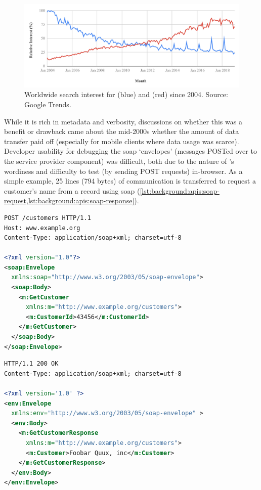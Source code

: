 \begin{figure}[h!]
  \centering
  \includegraphics[width=\linewidth]{rest-vs-soap}
  \caption[SOAP versus REST search interest over time]{Worldwide search interest for  (blue) and  (red) since 2004. Source: Google Trends.}
  \label{fig:background:apis:rest-vs-soap}
\end{figure}

While it is rich in metadata and verbosity, discussions on whether this was a benefit or drawback came about the mid-2000s \citep{zurMuehlen:2005ci,Pautasso2008} whether the amount of data transfer paid off (especially for mobile clients where data usage was scarce). Developer usability for debugging the \gls{soap} `envelopes' (messages POSTed over  to the service provider component) was difficult, both due to the nature of 's wordiness and difficulty to test (by sending POST requests) in-browser. As a simple example, 25 lines (794 bytes) of  communication is transferred to request a customer's name from a record using \gls{soap} (\cref{lst:background:apis:soap-request,lst:background:apis:soap-response}). 

\begin{samepage}
\begin{lstlisting}[language=xml,label=lst:background:apis:soap-request,caption={[An example SOAP request]A \gls{soap} \glsac{http} POST consumer request to retrieve customer record \#43456 from a web service provider. Source: \citep{Ballinger:2014aa}.}]
POST /customers HTTP/1.1
Host: www.example.org
Content-Type: application/soap+xml; charset=utf-8

<?xml version="1.0"?>
<soap:Envelope 
  xmlns:soap="http://www.w3.org/2003/05/soap-envelope">
  <soap:Body>
    <m:GetCustomer 
      xmlns:m="http://www.example.org/customers">
      <m:CustomerId>43456</m:CustomerId>
    </m:GetCustomer>
  </soap:Body>
</soap:Envelope>
\end{lstlisting}
\begin{lstlisting}[language=xml,label=lst:background:apis:soap-response,caption={[An example SOAP response]The \gls{soap} \glsac{http} service provider response for \cref{lst:background:apis:soap-request}. Source: \citep{Ballinger:2014aa}.}]
HTTP/1.1 200 OK
Content-Type: application/soap+xml; charset=utf-8

<?xml version='1.0' ?>
<env:Envelope 
  xmlns:env="http://www.w3.org/2003/05/soap-envelope" >
  <env:Body>
    <m:GetCustomerResponse 
      xmlns:m="http://www.example.org/customers">
      <m:Customer>Foobar Quux, inc</m:Customer>
    </m:GetCustomerResponse>
  </env:Body>
</env:Envelope>
\end{lstlisting}
\end{samepage}

